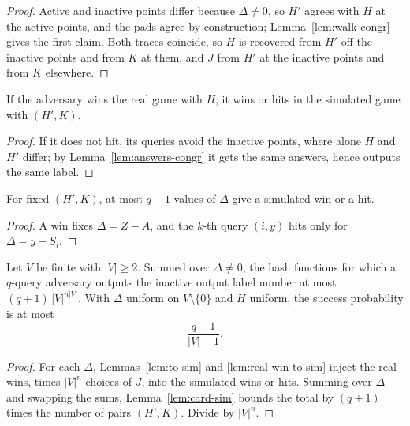 \begin{proof}
  \leanok
  Active and inactive points differ because $\Delta \neq 0$, so $H'$ agrees with $H$ at the active
  points, and the pads agree by construction; Lemma~\ref{lem:walk-congr} gives the first claim.
  Both traces coincide, so $H$ is recovered from $H'$ off the inactive points and from $K$ at
  them, and $J$ from $H'$ at the inactive points and from $K$ elsewhere.
\end{proof}

\begin{lemma}
  \label{lem:real-win-to-sim}
  \leanok
  If the adversary wins the real game with $H$, it wins or hits in the simulated game with
  $(H', K)$.
\end{lemma}

\begin{proof}
  \leanok
  If it does not hit, its queries avoid the inactive points, where alone $H$ and $H'$ differ;
  by Lemma~\ref{lem:answers-congr} it gets the same answers, hence outputs the same label.
\end{proof}

\begin{lemma}
  \label{lem:card-sim}
  \leanok
  For fixed $(H', K)$, at most $q + 1$ values of $\Delta$ give a simulated win or a hit.
\end{lemma}

\begin{proof}
  \leanok
  A win fixes $\Delta = Z - A$, and the $k$-th query $(i, y)$ hits only for $\Delta = y - S_i$.
\end{proof}

\begin{theorem}
  \label{thm:rom-bound}
  \leanok
  Let $V$ be finite with $|V| \geq 2$. Summed over $\Delta \neq 0$, the hash functions for which a $q$-query
  adversary outputs the inactive output label number at most $(q + 1)\,|V|^{n |V|}$. With
  $\Delta$ uniform on $V \setminus \{0\}$ and $H$ uniform, the success probability is at most
  \[ \frac{q + 1}{|V| - 1} . \]
\end{theorem}

\begin{proof}
  \leanok
  For each $\Delta$, Lemmas~\ref{lem:to-sim} and \ref{lem:real-win-to-sim} inject the real wins,
  times $|V|^n$ choices of $J$, into the simulated wins or hits. Summing over $\Delta$ and swapping
  the sums, Lemma~\ref{lem:card-sim} bounds the total by $(q + 1)$ times the number of pairs
  $(H', K)$. Divide by $|V|^n$.
\end{proof}

